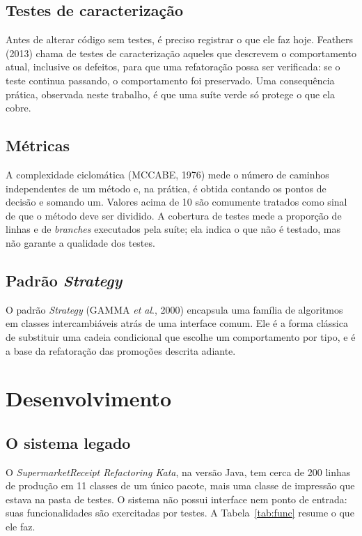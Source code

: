 \documentclass[12pt,a4paper]{article}
\begin{document}
\subsection{Testes de caracterização}

Antes de alterar código sem testes, é preciso registrar o que ele faz hoje. Feathers (2013) chama de testes de caracterização aqueles que descrevem o comportamento atual, inclusive os defeitos, para que uma refatoração possa ser verificada: se o teste continua passando, o comportamento foi preservado. Uma consequência prática, observada neste trabalho, é que uma suíte verde só protege o que ela cobre.

\subsection{Métricas}

A complexidade ciclomática (MCCABE, 1976) mede o número de caminhos independentes de um método e, na prática, é obtida contando os pontos de decisão e somando um. Valores acima de 10 são comumente tratados como sinal de que o método deve ser dividido. A cobertura de testes mede a proporção de linhas e de \textit{branches} executados pela suíte; ela indica o que não é testado, mas não garante a qualidade dos testes.

\subsection{Padrão \textit{Strategy}}

O padrão \textit{Strategy} (GAMMA \textit{et al}., 2000) encapsula uma família de algoritmos em classes intercambiáveis atrás de uma interface comum. Ele é a forma clássica de substituir uma cadeia condicional que escolhe um comportamento por tipo, e é a base da refatoração das promoções descrita adiante.

\section{Desenvolvimento}

\subsection{O sistema legado}

O \textit{SupermarketReceipt Refactoring Kata}, na versão Java, tem cerca de 200 linhas de produção em 11 classes de um único pacote, mais uma classe de impressão que estava na pasta de testes. O sistema não possui interface nem ponto de entrada: suas funcionalidades são exercitadas por testes. A Tabela~\ref{tab:func} resume o que ele faz.
\end{document}
